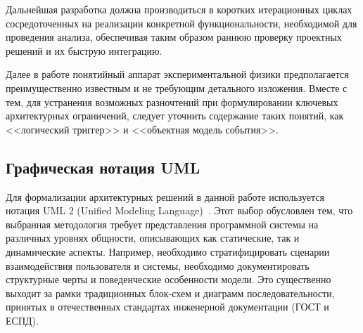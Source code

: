Дальнейшая разработка должна производиться в коротких итерационных
циклах сосредоточенных на реализации конкретной функциональности,
необходимой для проведения анализа,
обеспечивая таким образом раннюю проверку проектных решений и их
быструю интеграцию.


Далее в работе понятийный аппарат экспериментальной физики предполагается преимущественно известным и не требующим детального изложения. Вместе с тем, для устранения возможных разночтений при формулировании ключевых архитектурных ограничений, следует уточнить содержание таких понятий, как <<логический триггер>> и <<объектная модель события>>.

\subsection{Графическая нотация UML}

Для формализации архитектурных решений в данной работе
используется нотация UML 2 (Unified Modeling
Language)~\cite{uml2-std-iso19505-2, uml-2-book-pilone2012umlRU}.
Этот выбор обусловлен тем, что выбранная методология требует
представления программной системы на различных уровнях общности,
описывающих как статические, так и динамические аспекты.
Например, необходимо стратифицировать сценарии взаимодействия
пользователя и системы, необходимо документировать структурные
черты и поведенческие особенности модели. Это существенно выходит
за рамки традиционных блок-схем и диаграмм последовательности,
принятых в отечественных стандартах инженерной
документации (ГОСТ и ЕСПД).

